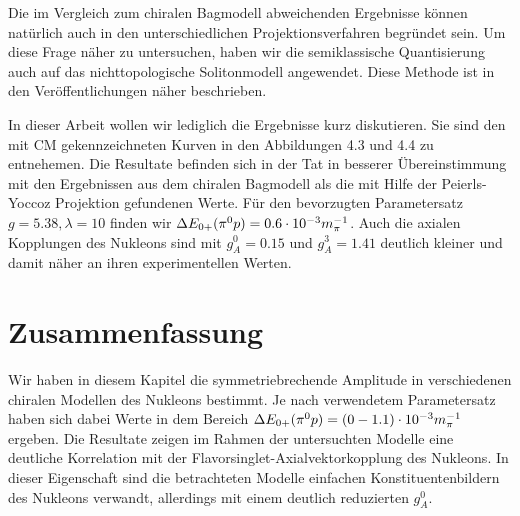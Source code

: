 Die im Vergleich zum chiralen Bagmodell abweichenden Ergebnisse 
k\"onnen nat\"urlich auch in den unterschiedlichen 
Projektionsverfahren begr\"undet sein. Um diese Frage n\"aher 
zu untersuchen, haben wir die  semiklassische
Quantisierung auch auf das nichttopologische Solitonmodell
angewendet. Diese Methode ist in den Ver\"offentlichungen
\cite{SW91,CB86} n\"aher beschrieben.


In dieser Arbeit wollen wir lediglich die Ergebnisse kurz 
diskutieren. Sie sind den mit CM gekennzeichneten Kurven
in den Abbildungen 4.3 und 4.4 zu entnehemen. Die Resultate befinden 
sich in der Tat in besserer \"Ubereinstimmung mit den  Ergebnissen
aus dem chiralen Bagmodell als die mit Hilfe der Peierls-Yoccoz
Projektion gefundenen Werte. F\"ur den bevorzugten Parametersatz
$g=5.38,\lambda =10$ finden wir $\Delta E_{0+}(\pi^0 p)=0.6\cdot 10^{-3} m_\pi^{-1}$. Auch die axialen
Kopplungen des Nukleons sind mit $g_A^0=0.15$ und $g_A^3=1.41$ 
deutlich kleiner und damit n\"aher an ihren experimentellen 
Werten. 


\section{Zusammenfassung}  
Wir haben in diesem Kapitel die symmetriebrechende Amplitude 
in verschiedenen chiralen Modellen des Nukleons bestimmt. 
Je nach verwendetem Parametersatz haben sich dabei Werte
in dem Bereich $\Delta E_{0+}(\pi^0 p) =(0-1.1)\cdot 10^{-3} m_\pi^{-1}$ ergeben. Die Resultate
zeigen im Rahmen der untersuchten Modelle eine deutliche 
Korrelation mit der Flavorsinglet-Axialvektorkopplung
des Nukleons. In dieser Eigenschaft sind die betrachteten 
Modelle einfachen Konstituentenbildern des Nukleons verwandt,
allerdings mit einem deutlich reduzierten $g_A^0$. 

